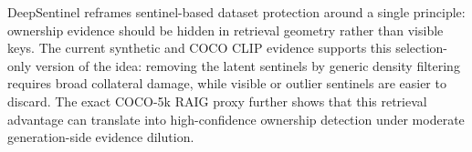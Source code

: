 \documentclass[letterpaper,twocolumn,10pt]{article}
\begin{document}
DeepSentinel reframes sentinel-based dataset protection around a single
principle: ownership evidence should be hidden in retrieval geometry rather than
visible keys. The current synthetic and COCO CLIP evidence supports this
selection-only version of the idea: removing the latent sentinels by generic
density filtering requires broad collateral damage, while visible or outlier
sentinels are easier to discard. The exact COCO-5k RAIG proxy further shows that
this retrieval advantage can translate into high-confidence ownership detection
under moderate generation-side evidence dilution.



\end{document}
